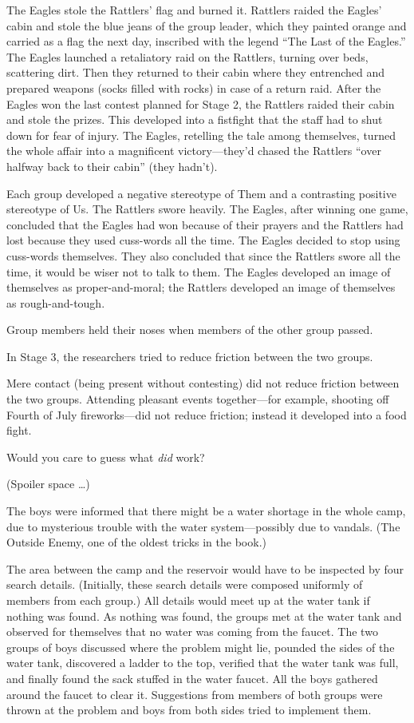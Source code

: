 {
 The Eagles stole the Rattlers' flag and burned it.
Rattlers raided the Eagles' cabin and stole the blue
jeans of the group leader, which they painted orange and carried as a
flag the next day, inscribed with the legend ``The
Last of the Eagles.'' The Eagles launched a
retaliatory raid on the Rattlers, turning over beds, scattering dirt.
Then they returned to their cabin where they entrenched and prepared
weapons (socks filled with rocks) in case of a return raid. After the
Eagles won the last contest planned for Stage 2, the Rattlers raided
their cabin and stole the prizes. This developed into a fistfight that
the staff had to shut down for fear of injury. The Eagles, retelling
the tale among themselves, turned the whole affair into a magnificent
victory---they'd chased the Rattlers
``over halfway back to their cabin''
(they hadn't).}

{
 Each group developed a negative stereotype of Them and a
contrasting positive stereotype of Us. The Rattlers swore heavily. The
Eagles, after winning one game, concluded that the Eagles had won
because of their prayers and the Rattlers had lost because they used
cuss-words all the time. The Eagles decided to stop using cuss-words
themselves. They also concluded that since the Rattlers swore all the
time, it would be wiser not to talk to them. The Eagles developed an
image of themselves as proper-and-moral; the Rattlers developed an
image of themselves as rough-and-tough.}

{
 Group members held their noses when members of the other group
passed.}

{
 In Stage 3, the researchers tried to reduce friction between the
two groups.}

{
 Mere contact (being present without contesting) did not reduce
friction between the two groups. Attending pleasant events
together---for example, shooting off Fourth of July fireworks---did not
reduce friction; instead it developed into a food fight.}

{
 Would you care to guess what \textit{did} work?}

{
 (Spoiler space \ldots)}

{
 The boys were informed that there might be a water shortage in the
whole camp, due to mysterious trouble with the water system---possibly
due to vandals. (The Outside Enemy, one of the oldest tricks in the
book.)}

{
 The area between the camp and the reservoir would have to be
inspected by four search details. (Initially, these search details were
composed uniformly of members from each group.) All details would meet
up at the water tank if nothing was found. As nothing was found, the
groups met at the water tank and observed for themselves that no water
was coming from the faucet. The two groups of boys discussed where the
problem might lie, pounded the sides of the water tank, discovered a
ladder to the top, verified that the water tank was full, and finally
found the sack stuffed in the water faucet. All the boys gathered
around the faucet to clear it. Suggestions from members of both groups
were thrown at the problem and boys from both sides tried to implement
them.}

